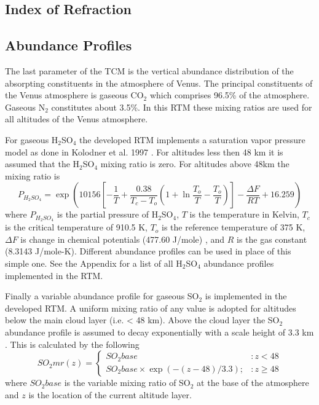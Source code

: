 \subsection{Index of Refraction}


\subsection{Abundance Profiles}
The last parameter of the TCM is the vertical abundance distribution of the absorpting constituents in the atmosphere of Venus. The principal constituents of the Venus atmosphere is gaseous CO$_2$ which comprises 96.5\% of the atmosphere. Gaseous N$_2$ constitutes about 3.5\%. In this RTM these mixing ratios are used for all altitudes of the Venus atmosphere. 

For gaseous H$_2$SO$_4$ the developed RTM implements a saturation vapor pressure model as done in Kolodner et al. 1997 \cite{Kolodner-thesis}. For altitudes less then 48 km it is assumed that the H$_2$SO$_4$ mixing ratio is zero. For altitudes above 48km the mixing ratio is
\begin{equation}
P_{H_2SO_4} = \exp\left(10156\left[ -\frac{1}{T}+ \frac{0.38}{T_c-T_o}\left(1+\ln\frac{T_o}{T} - \frac{T_o}{T}\right) \right] - \frac{\Delta F}{R T} + 16.259 \right)
\end{equation}
where $P_{H_2SO_4}$ is the partial pressure of H$_2$SO$_4$, $T$ is the temperature in Kelvin, $T_c$ is the critical temperature of 910.5 K, $T_o$ is the reference temperature of 375 K, $\Delta F$ is change in chemical potentials (477.60 J/mole) \cite{Giauque-1960}, and $R$ is the gas constant (8.3143 J/mole-K). Different abundance profiles can be used in place of this simple one. See the Appendix for a list of all H$_2$SO$_4$ abundance profiles implemented in the RTM.

Finally a variable abundance profile for gaseous SO$_2$ is implemented in the developed RTM. A uniform mixing ratio of any value is adopted for altitudes below the main cloud layer (i.e. < 48 km). Above the cloud layer the SO$_2$ abundance profile is assumed to decay exponentially with a scale height of 3.3 km \cite{Na-1994}. This is calculated by the following
\begin{equation}
SO_2mr(z) = \left\{
     \begin{array}{lr}
       SO_2base & : z < 48\\
       SO_2base\times\exp(-(z-48)/3.3); & : z\geq 48
     \end{array}
   \right.
\end{equation}
where $SO_2base$ is the variable mixing ratio of SO$_2$ at the base of the atmosphere and $z$ is the location of the current altitude layer.
